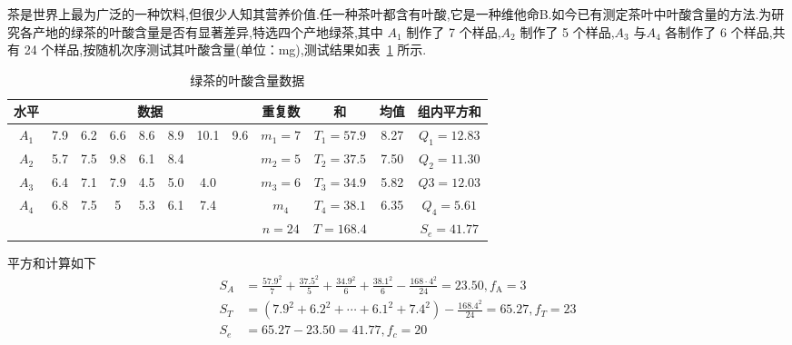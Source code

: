 \begin{example}\label{exam:8.3.2}
茶是世界上最为广泛的一种饮料,但很少人知其营养价值.任一种茶叶都含有叶酸,它是一种维他命B.如今已有测定茶叶中叶酸含量的方法.为研究各产地的绿茶的叶酸含量是否有显著差异,特选四个产地绿茶,其中 $A_1$ 制作了 7 个样品,$A_2$ 制作了 5 个样品,$A_3$ 与$A_4$ 各制作了 6 个样品,共有 24 个样品,按随机次序测试其叶酸含量(单位：\si{mg}),测试结果如表~\ref{tab:8.3.3} 所示.

\begin{table}[htbp]
  \centering
  \caption{绿茶的叶酸含量数据}
  \begin{tabular}{cccccccccccc}
    \toprule
    \multicolumn{1}{c|}{水平} & \multicolumn{7}{c|}{数据}                               & 重复数   & 和     & 均值    & 组内平方和 \\
    \midrule
    \multicolumn{1}{c|}{$A_1$} & 7.9   & 6.2   & 6.6   & 8.6   & 8.9   & 10.1  & \multicolumn{1}{c|}{9.6} & $m_1=7$  & $T_1=57.9$ & 8.27  & $Q_1=12.83$ \\
    \multicolumn{1}{c|}{$A_2$} & 5.7   & 7.5   & 9.8   & 6.1   & 8.4   &       & \multicolumn{1}{c|}{} & $m_2=5$  & $T_2=37.5$ & 7.50   & $Q_2=11.30$ \\
    \multicolumn{1}{c|}{$A_3$} & 6.4   & 7.1   & 7.9   & 4.5   & 5.0     & 4.0     & \multicolumn{1}{c|}{} & $m_3=6$  & $T_3=34.9$ & 5.82  & $Q3=12.03$ \\
    \multicolumn{1}{c|}{$A_4$} & 6.8   & 7.5   & 5     & 5.3   & 6.1   & 7.4   & \multicolumn{1}{c|}{} & $m_4$    & $T_4=38.1$ & 6.35  & $Q_4=5.61$ \\
    \midrule
    \multicolumn{8}{c}{}                                          & $n=24$  & $T=168.4$ &       & $S_e=41.77$ \\
    \bottomrule
    \end{tabular}%
  \label{tab:8.3.3}%
\end{table}%
平方和计算如下
\begin{equation*}
  \begin{split}
  S_{A}&=\frac{57.9^{2}}{7}+\frac{37.5^{2}}{5}+\frac{34.9^{2}}{6}+\frac{38.1^{2}}{6}-\frac{168 \cdot 4^{2}}{24}=23.50, f_{\mathrm{A}}=3\\
  S_{T}&=\left(7.9^{2}+6.2^{2}+\cdots+6.1^{2}+7.4^{2}\right)-\frac{168.4^{2}}{24}=65.27, f_{T}=23 \\
  S_{e}&=65.27-23.50=41.77, f_{c}=20
  \end{split}
\end{equation*}


\end{example}

